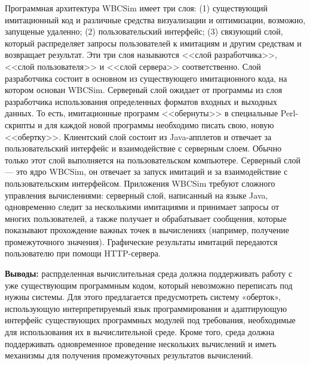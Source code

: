 Программная архитектура WBCSim имеет три слоя: (1) существующий имитационный код и различные средства визуализации и оптимизации, возможно, запущеные удаленно; (2) пользовательский интерфейс; (3) связующий слой, который распределяет запросы пользователей к имитациям и другим средствам и возвращает результат. Эти три слоя называются <<слой разработчика>>, <<слой пользователя>> и <<слой сервера>> соответственно. Слой разработчика состоит в основном из существующего имитационного кода, на котором основан WBCSim. Серверный слой ожидает от программы из слоя разработчика использования определенных форматов входных и выходных данных. То есть, имитационные программ <<обернуты>> в специальные Perl-скрипты и для каждой новой программы необходимо писать свою, новую <<обертку>>. Клиентский слой состоит из Java-апплетов и отвечает за пользовательский интерфейс и взаимодействие с серверным слоем. Обычно только этот слой выполняется на пользовательском компьютере. Серверный слой --- это ядро WBCSim, он отвечает за запуск имитаций и за взаимодействие с пользовательским интерфейсом. Приложения WBCSim требуют сложного управления вычислениями: серверный слой, написанный на языке Java, одновременно следит за несколькими имитациями и принимает запросы от многих пользователей, а также получает и обрабатывает сообщения, которые показывают прохождение важных точек в вычислениях (например, получение промежуточного значения). Графические результаты имитаций передаются пользователю при помощи HTTP-сервера.

\textbf{Выводы:} распрделенная вычислительная среда должна поддерживать работу с уже существующим программным кодом, который невозможно переписать под нужны системы. Для этого предлагается предусмотреть систему «оберток», использующую интерпретируемый язык программирования и адаптирующую интерфейс существующих программных модулей под требования, необходимые для использования их в вычислительной среде. Кроме того, среда должна поддерживать одновременное проведение нескольких вычислений и иметь механизмы для получения промежуточных результатов вычислений.

